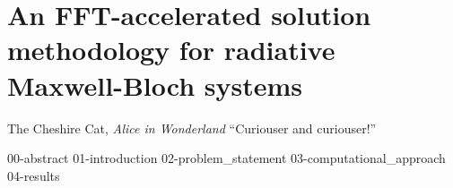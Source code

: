 \chapter{\label{ch:accelerator}An FFT-accelerated solution methodology for radiative Maxwell-Bloch systems}

\begin{frontquote}{The Cheshire Cat, \emph{Alice in Wonderland}}
  ``Curiouser and curiouser!''
\end{frontquote}

{00-abstract}
{01-introduction}
{02-problem_statement}
{03-computational_approach}
{04-results}
